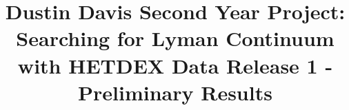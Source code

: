 \documentclass{aastex62}
\begin{document}
\title{Dustin Davis Second Year Project: Searching for Lyman Continuum with HETDEX Data Release 1 - Preliminary Results}


\end{document}
